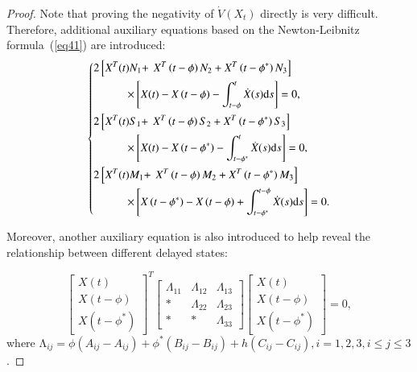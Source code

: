 \documentclass[journal]{IEEEtran}
\begin{document}
\begin{proof}
  Note that proving the negativity of $\dot{V}\left(X_t\right)$ directly is very difficult. Therefore, additional auxiliary equations based on the Newton-Leibnitz formula~(\ref{eq41}) are introduced:
  \begin{equation}
    \left\{ \begin{gathered}
      2\left[ {{X^{T}}(t){N_1} + } \right.\left. {{X^{T}}\left( {t - \phi } \right){N_2} + {X^{T}}\left( {t - {\phi ^*}} \right){N_3}} \right] \hfill \\
      \quad \quad \quad  \times \left[ {X(t) - X\left( {t - \phi } \right) - \int_{t - \phi }^t {\dot X} (s){\text{d}}s} \right] = 0, \hfill \\
      2\left[ {{X^{T}}(t){S_1} + } \right.\left. {{X^{T}}\left( {t - \phi } \right){S_2} + {X^{T}}\left( {t - {\phi ^*}} \right){S_3}} \right] \hfill \\
      \quad \quad \quad  \times \left[ {X(t) - X\left( {t - {\phi ^*}} \right) - \int_{t - {\phi ^*}}^t {\dot X} (s){\text{d}}s} \right] = 0, \hfill \\
      2\left[ {{X^{T}}(t){M_1} + } \right.\left. {{X^{T}}\left( {t - \phi } \right){M_2} + {X^{T}}\left( {t - {\phi ^*}} \right){M_3}} \right] \hfill \\
      \quad \quad \quad  \times \left[ {X\left( {t - {\phi ^*}} \right) - X\left( {t - \phi } \right) + \int_{t - {\phi ^*}}^{t - \phi } {\dot X} (s){\text{d}}s} \right] = 0. \hfill \\
    \end{gathered}  \right.
    \label{eq48}
  \end{equation}

  Moreover, another auxiliary equation is also introduced to help reveal the relationship between different delayed states:

  \begin{equation}
    {\left[ {\begin{array}{*{20}{c}}
              {X(t)}                        \\
              {X\left( {t - \phi } \right)} \\
              {X\left( {t - {\phi ^*}} \right)}
            \end{array}} \right]^{T}}\left[ {\begin{array}{*{20}{c}}
            {{\Lambda _{11}}} & {{\Lambda _{12}}} & {{\Lambda _{13}}} \\
            *                 & {{\Lambda _{22}}} & {{\Lambda _{23}}} \\
            *                 & *                 & {{\Lambda _{33}}}
          \end{array}} \right]\left[ {\begin{array}{*{20}{c}}
            {X(t)}                        \\
            {X\left( {t - \phi } \right)} \\
            {X\left( {t - {\phi ^*}} \right)}
          \end{array}} \right] = 0,
    \label{eq49}
  \end{equation}
  where $\mathrm{\Lambda}_{ij}=\phi\left(A_{ij}-A_{ij}\right)+\phi^\ast\left(B_{ij}-B_{ij}\right)+h\left(C_{ij}-C_{ij}\right),i=1,2,3,i\le j\le 3$.


\end{proof}
\end{document}
